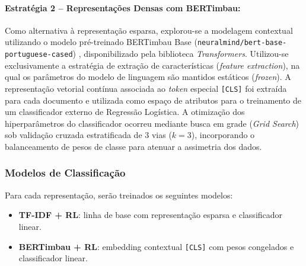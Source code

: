 \documentclass{IEEEtran}
\begin{document}

\paragraph{Estratégia 2 -- Representações Densas com BERTimbau:}
Como alternativa à representação esparsa, explorou-se a modelagem contextual utilizando o modelo pré-treinado BERTimbau Base (\texttt{neuralmind/bert-base-portuguese-cased}) \cite{souza2020bertimbau}, disponibilizado pela biblioteca \textit{Transformers}. Utilizou-se exclusivamente a estratégia de extração de características (\textit{feature extraction}), na qual os parâmetros do modelo de linguagem são mantidos estáticos (\textit{frozen}). A representação vetorial contínua associada ao \textit{token} especial \texttt{[CLS]} foi extraída para cada documento e utilizada como espaço de atributos para o treinamento de um classificador externo de Regressão Logística. A otimização dos hiperparâmetros do classificador ocorreu mediante busca em grade (\textit{Grid Search}) sob validação cruzada estratificada de 3 vias ($k=3$), incorporando o balanceamento de pesos de classe para atenuar a assimetria dos dados.



\subsubsection{Modelos de Classificação}
\label{subsubsec:classifiers}

Para cada representação, serão treinados os seguintes modelos:

\begin{itemize}[noitemsep]
  \item \textbf{TF-IDF + RL}: linha de base com representação esparsa e classificador linear.
  \item \textbf{BERTimbau + RL}: embedding contextual \texttt{[CLS]} com pesos congelados e classificador linear.
\end{itemize}
\end{document}
